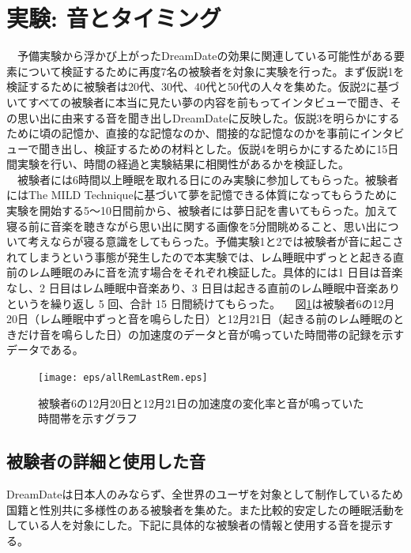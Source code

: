 \section{実験: 音とタイミング}
　予備実験から浮かび上がったDreamDateの効果に関連している可能性がある要素について検証するために再度7名の被験者を対象に実験を行った。まず仮説1を検証するために被験者は20代、30代、40代と50代の人々を集めた。仮説2に基づいてすべての被験者に本当に見たい夢の内容を前もってインタビューで聞き、その思い出に由来する音を聞き出しDreamDateに反映した。仮説3を明らかにするために頃の記憶か、直接的な記憶なのか、間接的な記憶なのかを事前にインタビューで聞き出し、検証するための材料とした。仮説4を明らかにするために15日間実験を行い、時間の経過と実験結果に相関性があるかを検証した。\\
　被験者には6時間以上睡眠を取れる日にのみ実験に参加してもらった。被験者にはThe MILD Techniqueに基づいて夢を記憶できる体質になってもらうために実験を開始する5〜10日間前から、被験者には夢日記を書いてもらった。加えて寝る前に音楽を聴きながら思い出に関する画像を5分間眺めること、思い出について考えならが寝る意識をしてもらった。予備実験1と2では被験者が音に起こされてしまうという事態が発生したので本実験では、レム睡眠中ずっとと起きる直前のレム睡眠のみに音を流す場合をそれぞれ検証した。具体的には1 日目は音楽なし、2 日目はレム睡眠中音楽あり、3 日目は起きる直前のレム睡眠中音楽ありというを繰り返し 5 回、合計 15 日間続けてもらった。
　図\ref{allRemLastRem}は被験者6の12月20日（レム睡眠中ずっと音を鳴らした日）と12月21日（起きる前のレム睡眠のときだけ音を鳴らした日）の加速度のデータと音が鳴っていた時間帯の記録を示すデータである。

\begin{figure}[htbp]
\begin{center}
\texttt{[image: eps/allRemLastRem.eps]}
\caption{被験者6の12月20日と12月21日の加速度の変化率と音が鳴っていた時間帯を示すグラフ}
\label{allRemLastRem}
\end{center}
\end{figure}

\subsection{被験者の詳細と使用した音}
DreamDateは日本人のみならず、全世界のユーザを対象として制作しているため国籍と性別共に多様性のある被験者を集めた。また比較的安定したの睡眠活動をしている人を対象にした。下記に具体的な被験者の情報と使用する音を提示する。\\

